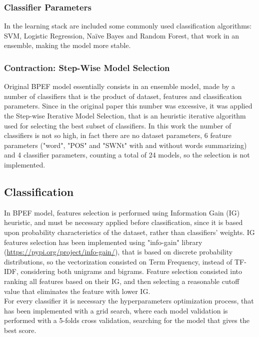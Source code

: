\subsubsection{Classifier Parameters}

In the learning stack are included some commonly used classification algorithms: \acl{SVM}, Logistic Regression, Na{\"i}ve Bayes and Random Forest, that work in an ensemble, making the model more stable.


\subsubsection{Contraction: Step-Wise Model Selection}

Original BPEF model essentially consists in an ensemble model, made by a number of classifiers that is the product of dataset, features and classification parameters. Since in the original paper this number was excessive, it was applied the Step-wise Iterative Model Selection, that is an heuristic iterative algorithm used for selecting the best subset of classifiers. In this work the number of classifiers is not so high, in fact there are no dataset parameters, 6 feature parameters ("word", "POS" and "SWNt" with and without words summarizing) and 4 classifier parameters, counting a total of 24 models, so the selection is not implemented.

\subsection{Classification}

In BPEF model, features selection is performed using Information Gain (IG) heuristic, and must be necessary applied before classification, since it is based upon probability characteristics of the dataset, rather than classifiers' weights. IG features selection has been implemented using "info-gain" library (\url{https://pypi.org/project/info-gain/}), that is based on discrete probability distributions, so the vectorization consisted on Term Frequency, instead of TF-IDF, considering both unigrams and bigrams. Feature selection consisted into ranking all features based on their IG, and then selecting a reasonable cutoff value that eliminates the feature with lower IG.\\
For every classifier it is necessary the hyperparameters optimization process, that has been implemented with a grid search, where each model validation is performed with a 5-folds cross validation, searching for the model that gives the best score.


